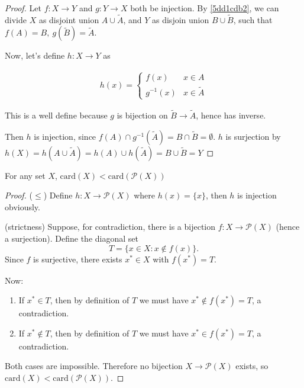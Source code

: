 \begin{proof}
    Let $f: X \to Y$ and $g: Y \to X$ both be injection.
    By \cref{5dd1cdb2}, we can divide $X$ as disjoint union $A \cup \tilde{A}$, and $Y$
    as disjoin union $B \cup \tilde{B}$, such that $f(A) = B,\: g(\tilde{B}) = \tilde{A}$.

    Now, let's define $h: X \to Y$ as

    \begin{align*}
        h(x) = \begin{cases}
            f(x) & x \in A\\
            g^{-1}(x) & x \in \tilde{A}
        \end{cases}
    \end{align*}

    This is a well define because $g$ is bijection on $\tilde{B} \to \tilde{A}$, hence has inverse.

    Then $h$ is injection, since $f(A) \cap g^{-1}(\tilde{A}) = B \cap \tilde{B} = \emptyset$. $h$
    is surjection by $h(X) = h(A \cup \tilde{A}) = h(A) \cup h(\tilde{A}) = B \cup \tilde{B} = Y$
\end{proof}

\begin{prop}
For any set $X$, $\mathrm{card}(X) < \mathrm{card}(\mathscr{P}(X))$
\end{prop}

\begin{proof}
    ($\le$) Define $h: X \to \mathscr{P}(X)$ where $h(x) = \{x\}$, then $h$ is injection obviously.


(strictness) Suppose, for contradiction, there is a bijection $f:X\to\mathscr{P}(X)$
(hence a surjection). Define the diagonal set
\[
T=\{x\in X: x\notin f(x)\}.
\]
Since $f$ is surjective, there exists $x^*\in X$ with $f(x^*)=T$.

Now:

\begin{enumerate}
    \item If $x^*\in T$, then by definition of $T$ we must have $x^*\notin f(x^*)=T$,
  a contradiction.

    \item If $x^*\notin T$, then by definition of $T$ we must have $x^*\in f(x^*)=T$,
  a contradiction.

\end{enumerate}
Both cases are impossible. Therefore no bijection $X\to\mathscr{P}(X)$ exists, so
$\mathrm{card}(X)<\mathrm{card}(\mathscr{P}(X))$.
\end{proof}


